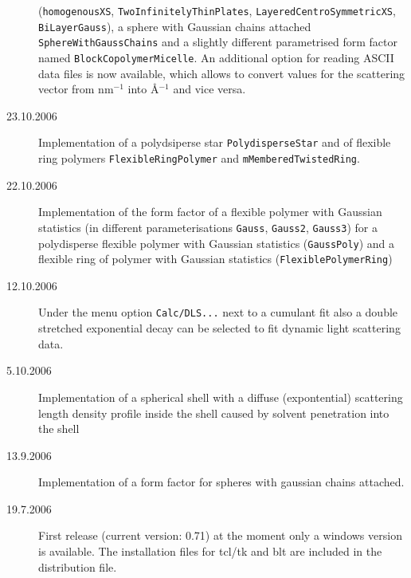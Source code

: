 \begin{description}
    (\texttt{homogenousXS}, \texttt{TwoInfinitelyThinPlates},
     \texttt{LayeredCentroSymmetricXS}, \texttt{BiLayerGauss}), a sphere with Gaussian chains attached
    \texttt{SphereWithGaussChains} and a slightly different parametrised form factor named
    \texttt{BlockCopolymerMicelle}.
    An additional option for reading ASCII data files is now available,
    which allows to convert values for the scattering vector from
    nm$^{-1}$ into \AA$^{-1}$ and vice versa. \sloppy
    \item[23.10.2006] Implementation of a polydsiperse star \texttt{PolydisperseStar} and
    of flexible ring polymers \texttt{FlexibleRingPolymer} and \texttt{mMemberedTwistedRing}.
    \item[22.10.2006] Implementation of the form factor of a flexible polymer with Gaussian statistics
    (in different parameterisations \verb"Gauss", \verb"Gauss2", \verb"Gauss3") for a polydisperse flexible
    polymer with Gaussian statistics (\verb"GaussPoly") and a flexible ring of polymer with Gaussian statistics
    (\verb"FlexiblePolymerRing")
    \item[12.10.2006] Under the menu option \verb"Calc/DLS..." next to a cumulant fit also
      a double stretched exponential decay can be selected to fit dynamic light scattering data.
    \item[5.10.2006] Implementation of a spherical shell with a diffuse
      (expontential) scattering length density profile inside the shell
      caused by solvent penetration into the shell
    \item[13.9.2006] Implementation of a form factor for spheres
      with gaussian chains attached.
    \item[19.7.2006] First release (current version: 0.71)
      at the moment only a windows version is available. The
      installation files for tcl/tk and blt are included in the
      distribution file.
\end{description}

